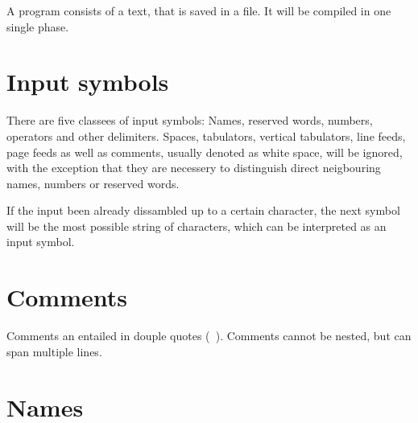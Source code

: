 A program consists of a text, that is saved in a file. It will be
compiled in one single phase.
\iffalse
Ein Programm besteht aus einem Text, der in einer Datei gespeichert ist.
Es wird in einer einzigen Phase übersetzt.
\fi

\section{Input symbols}\label{sec:eingabesymbole}
\label{zweieins}

There are five classees  of input symbols:
Names, reserved words,
numbers,
operators  and  other
delimiters.  Spaces, tabulators,
vertical tabulators,
line feeds, page feeds
as well as comments,
usually denoted as white space,  will be ignored, with the exception
that they are necessery to distinguish direct neigbouring names,
numbers or reserved words.

If the input been already dissambled up to a certain character, the
next symbol will be the most possible string of characters, which can
be interpreted as an input symbol.

\section{Comments}\label{sec:kommentare}
\label{zweizwei}

Comments an entailed in douple quotes ({\tt
  \dq}).
Comments cannot be nested, but can span multiple lines.

\section{Names}\label{sec:namen}
\label{zweidrei}

